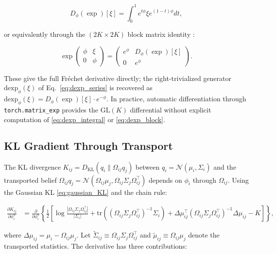 \documentclass[twoside,11pt]{article}
\begin{document}
\begin{equation}
D_\phi(\exp)[\xi] = \int_0^1 e^{t\phi} \xi e^{(1-t)\phi} dt,
\label{eq:dexp_integral}
\end{equation}

or equivalently through the $(2K \times 2K)$ block matrix identity \citep[Algorithm~10.27]{Higham2008}:

\begin{equation}
\exp \begin{pmatrix} \phi & \xi \\ 0 & \phi \end{pmatrix}
= \begin{pmatrix} e^\phi & D_\phi(\exp)[\xi] \\ 0 & e^\phi \end{pmatrix}.
\label{eq:dexp_block}
\end{equation}

These give the full Fr\'{e}chet derivative directly; the right-trivialized generator $\mathrm{dexp}_\phi(\xi)$ of Eq.~\eqref{eq:dexp_series} is recovered as $\mathrm{dexp}_\phi(\xi) = D_\phi(\exp)[\xi] \cdot e^{-\phi}$. In practice, automatic differentiation through \texttt{torch.matrix\_exp} provides the $\mathrm{GL}(K)$ differential without explicit computation of \eqref{eq:dexp_integral} or \eqref{eq:dexp_block}.

\subsection{KL Gradient Through Transport}

The KL divergence $K_{ij} = D_{\mathrm{KL}}(q_i \| \Omega_{ij} q_j)$ between $q_i = \mathcal{N}(\mu_i, \Sigma_i)$ and the transported belief $\Omega_{ij} q_j = \mathcal{N}(\Omega_{ij}\mu_j, \Omega_{ij}\Sigma_j\Omega_{ij}^\top)$ depends on $\phi_i$ through $\Omega_{ij}$. Using the Gaussian KL \eqref{eq:gaussian_KL} and the chain rule:

\begin{align}
\frac{\partial K_{ij}}{\partial \phi_i^a}
&= \frac{\partial}{\partial \phi_i^a}\left\{
\frac{1}{2}\left[
\log\frac{|\Omega_{ij}\Sigma_j\Omega_{ij}^\top|}{|\Sigma_i|}
+ \mathrm{tr} \left((\Omega_{ij}\Sigma_j\Omega_{ij}^\top)^{-1}\Sigma_i\right)
+ \Delta\mu_{ij}^\top (\Omega_{ij}\Sigma_j\Omega_{ij}^\top)^{-1} \Delta\mu_{ij}
- K
\right]\right\},
\label{eq:dKL_dphi_expanded}
\end{align}

where $\Delta\mu_{ij} = \mu_i - \Omega_{ij}\mu_j$. Let $\tilde{\Sigma}_{ij} \equiv \Omega_{ij}\Sigma_j\Omega_{ij}^\top$ and $\tilde{\mu}_{ij} \equiv \Omega_{ij}\mu_j$ denote the transported statistics. The derivative has three contributions:
\end{document}

